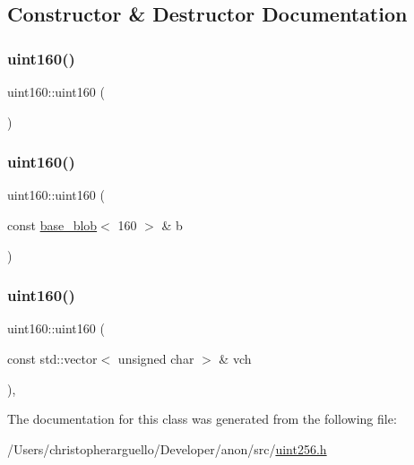 \subsection{Constructor \& Destructor Documentation}
\mbox{\label{classuint160_a66918f25b891415f2a9bbbb1dfdbedbd}} 
\subsubsection{\texorpdfstring{uint160()}{uint160()}\hspace{0.1cm}{\footnotesize\ttfamily [1/3]}}
{\footnotesize\ttfamily uint160\+::uint160 (\begin{DoxyParamCaption}{ }\end{DoxyParamCaption})\hspace{0.3cm}{\ttfamily [inline]}}

\mbox{\label{classuint160_aafc05eec384bffea281460902ad40d8d}} 
\subsubsection{\texorpdfstring{uint160()}{uint160()}\hspace{0.1cm}{\footnotesize\ttfamily [2/3]}}
{\footnotesize\ttfamily uint160\+::uint160 (\begin{DoxyParamCaption}\item[{const \mbox{\hyperlink{classbase__blob}{base\+\_\+blob}}$<$ 160 $>$ \&}]{b }\end{DoxyParamCaption})\hspace{0.3cm}{\ttfamily [inline]}}

\mbox{\label{classuint160_a92bd85c77e73d6642f9bb7519cbd480c}} 
\subsubsection{\texorpdfstring{uint160()}{uint160()}\hspace{0.1cm}{\footnotesize\ttfamily [3/3]}}
{\footnotesize\ttfamily uint160\+::uint160 (\begin{DoxyParamCaption}\item[{const std\+::vector$<$ unsigned char $>$ \&}]{vch }\end{DoxyParamCaption})\hspace{0.3cm}{\ttfamily [inline]}, {\ttfamily [explicit]}}



The documentation for this class was generated from the following file\+:\begin{DoxyCompactItemize}
\item 
/\+Users/christopherarguello/\+Developer/anon/src/\mbox{\hyperlink{uint256_8h}{uint256.\+h}}\end{DoxyCompactItemize}
